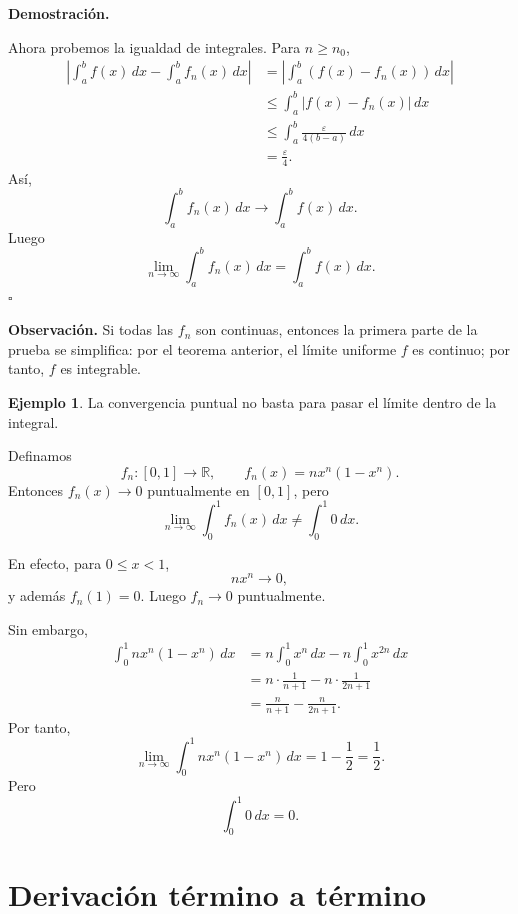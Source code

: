 \documentclass[11pt,a4paper,openany]{book}
\theoremstyle{definition}
\newtheorem{ejemplo}{Ejemplo}[chapter]
\theoremstyle{plain}
\theoremstyle{remark}
\renewenvironment{proof}[1][\textbf{Demostración.}]{%
  \par\noindent #1\ \normalfont
}{\hfill$\square$\par\medskip}
\newenvironment{observacion}
{\par\medskip\noindent\textbf{Observación. }\normalfont}
{\par\medskip}
\newcommand{\R}{\mathbb{R}}
\begin{document}
\begin{proof}
Ahora probemos la igualdad de integrales. Para $n\geq n_0$,
\[
\begin{aligned}
    \left|
    \int_a^b f(x)\,dx
    -
    \int_a^b f_n(x)\,dx
    \right|
    &=
    \left|
    \int_a^b (f(x)-f_n(x))\,dx
    \right| \\
    &\leq
    \int_a^b |f(x)-f_n(x)|\,dx \\
    &\leq
    \int_a^b \frac{\varepsilon}{4(b-a)}\,dx \\
    &=
    \frac{\varepsilon}{4}.
\end{aligned}
\]
Así,
\[
    \int_a^b f_n(x)\,dx
    \to
    \int_a^b f(x)\,dx.
\]
Luego
\[
    \lim_{n\to\infty}\int_a^b f_n(x)\,dx
    =
    \int_a^b f(x)\,dx.
\]
\end{proof}

\begin{observacion}
Si todas las $f_n$ son continuas, entonces la primera parte de la prueba se
simplifica: por el teorema anterior, el límite uniforme $f$ es continuo; por
tanto, $f$ es integrable.
\end{observacion}

\begin{ejemplo}
La convergencia puntual no basta para pasar el límite dentro de la integral.

Definamos
\[
    f_n:[0,1]\to\R,\qquad f_n(x)=n x^n(1-x^n).
\]
Entonces $f_n(x)\to 0$ puntualmente en $[0,1]$, pero
\[
    \lim_{n\to\infty}\int_0^1 f_n(x)\,dx
    \neq
    \int_0^1 0\,dx.
\]

En efecto, para $0\leq x<1$,
\[
    n x^n\to 0,
\]
y además $f_n(1)=0$. Luego $f_n\to 0$ puntualmente.

Sin embargo,
\[
\begin{aligned}
    \int_0^1 n x^n(1-x^n)\,dx
    &=
    n\int_0^1 x^n\,dx
    -
    n\int_0^1 x^{2n}\,dx \\
    &=
    n\cdot \frac{1}{n+1}
    -
    n\cdot \frac{1}{2n+1} \\
    &=
    \frac{n}{n+1}
    -
    \frac{n}{2n+1}.
\end{aligned}
\]
Por tanto,
\[
    \lim_{n\to\infty}
    \int_0^1 n x^n(1-x^n)\,dx
    =
    1-\frac12
    =
    \frac12.
\]
Pero
\[
    \int_0^1 0\,dx=0.
\]
\end{ejemplo}

\section{Derivación término a término}
\end{document}
